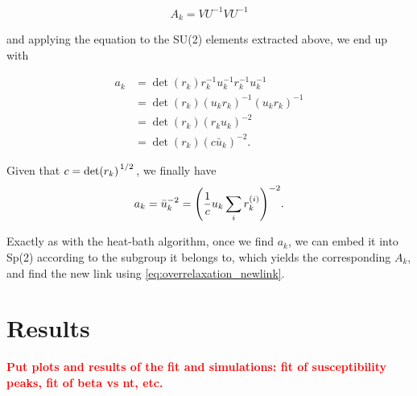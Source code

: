 \documentclass[reqno,12pt]{article}
\numberwithin{equation}{section}
\newcommand{\red}[1]{\textbf{\textcolor{red}{#1}}}
\begin{document}
\begin{equation}
	A_k = V U^{-1} V U^{-1}
\end{equation}

and applying the equation to the SU(2) elements extracted above, we end up with

\begin{equation}
	\begin{aligned}
		a_k &= \det(r_k) r_k^{-1} u_k^{-1} r_k^{-1} u_k^{-1} \\
		&= \det(r_k) (u_k r_k)^{-1} (u_k r_k)^{-1} \\
		&= \det(r_k) (r_k u_k)^{-2} \\
		&= \det(r_k) (c \bar{u}_k)^{-2}.
	\end{aligned}
\end{equation}

Given that $c = \det(r_k)^{\flatfrac{1}{2}}$, we finally have
\begin{equation}
	a_k = \bar{u}_k^{-2} = \qty(\frac{1}{c} u_k \sum_i r_k^{(i)})^{-2}.
\end{equation}

Exactly as with the heat-bath algorithm, once we find $a_k$, we can embed it into Sp(2) according to the
subgroup it belongs to, which yields the corresponding $A_k$, and find the new link using \eqref{eq:overrelaxation_newlink}.

\section{Results}
\red{Put plots and results of the fit and simulations: fit of susceptibility peaks, fit of beta vs nt, etc.}

\printbibliography
\end{document}
